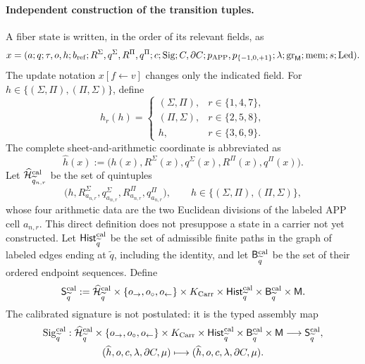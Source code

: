 \paragraph{Independent construction of the transition tuples.}
A fiber state is written, in the order of its relevant fields, as
\[
 x=(a;q;\tau,o,h;b_{\rm ref};
       R^\Sigma,q^\Sigma,R^\Pi,q^\Pi;c;
       \operatorname{Sig};C,\partial C;p_{\mathrm{APP}},p_{\{-1,0,+1\}};
       \lambda;\operatorname{gr}_{\mathsf M};\operatorname{mem};
       s;\operatorname{Led}).
\]
The update notation \(x[f\leftarrow v]\) changes only the indicated field.
For \(h\in\{(\Sigma,\Pi),(\Pi,\Sigma)\}\), define
\[
 h_r(h)=
 \begin{cases}
  (\Sigma,\Pi),&r\in\{1,4,7\},\\
  (\Pi,\Sigma),&r\in\{2,5,8\},\\
 h,&r\in\{3,6,9\}.
 \end{cases}
\]
The complete sheet-and-arithmetic coordinate is abbreviated as
\[
 \widehat h(x):=
 \bigl(h(x),R^\Sigma(x),q^\Sigma(x),R^\Pi(x),q^\Pi(x)\bigr).
\]
Let \(\widehat{\mathcal H}^{\rm cal}_{\widetilde q_{n,r}}\) be the set of
quintuples
\[
 \bigl(h,R^\Sigma_{a_{n,r}},q^\Sigma_{a_{n,r}},
          R^\Pi_{a_{n,r}},q^\Pi_{a_{n,r}}\bigr),
 \qquad
 h\in\{(\Sigma,\Pi),(\Pi,\Sigma)\},
\]
whose four arithmetic data are the two Euclidean divisions of the labeled APP
cell \(a_{n,r}\). This direct definition does not presuppose a state in a
carrier not yet constructed. Let
\(\mathsf{Hist}^{\rm cal}_{\widetilde q}\) be the set of admissible finite
paths in the graph of labeled edges ending at \(\widetilde q\), including the
identity, and let \(\mathsf B^{\rm cal}_{\widetilde q}\) be the set of their
ordered endpoint sequences. Define
\[
 \mathsf S^{\rm cal}_{\widetilde q}:=
 \widehat{\mathcal H}^{\rm cal}_{\widetilde q}
 \times\{o_{\rightarrow},o_{\circ},o_{\leftarrow}\}
 \times K_{\rm Carr}\times
 \mathsf{Hist}^{\rm cal}_{\widetilde q}\times
 \mathsf B^{\rm cal}_{\widetilde q}\times\mathsf M .
\]
The calibrated signature is not postulated: it is the typed assembly map
\[\begin{gathered}
 \operatorname{Sig}^{\rm cal}_{\widetilde q}:
 \widehat{\mathcal H}^{\rm cal}_{\widetilde q}
 \times\{o_{\rightarrow},o_{\circ},o_{\leftarrow}\}
 \times K_{\rm Carr}\times
 \mathsf{Hist}^{\rm cal}_{\widetilde q}\times
 \mathsf B^{\rm cal}_{\widetilde q}\times\mathsf M
 \longrightarrow\mathsf S^{\rm cal}_{\widetilde q},
\\
 (\widehat h,o,c,\lambda,\partial C,\mu)
 \longmapsto(\widehat h,o,c,\lambda,\partial C,\mu).
\end{gathered}\]

